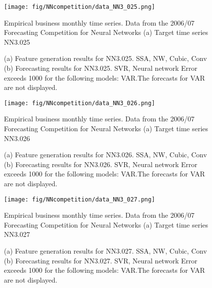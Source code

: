 \documentclass[12pt]{article}
\begin{document}
\begin{figure}
\centering
\texttt{[image: fig/NNcompetition/data\_NN3\_025.png]}
\caption{Empirical business monthly time series. Data from the 2006/07 Forecasting Competition for Neural Networks	(a) Target time series	NN3.025	}
\end{figure}


\begin{figure}
\centering
{}
\caption{(a)	Feature generation results for	NN3.025.	SSA, NW, Cubic, Conv	(b)	Forecasting results for	NN3.025.	SVR, Neural network	Error exceeds 1000 for the following models: VAR.The forecasts for VAR are not displayed.	}
\end{figure}


\begin{figure}
\centering
\texttt{[image: fig/NNcompetition/data\_NN3\_026.png]}
\caption{Empirical business monthly time series. Data from the 2006/07 Forecasting Competition for Neural Networks	(a) Target time series	NN3.026	}
\end{figure}


\begin{figure}
\centering
{}
\caption{(a)	Feature generation results for	NN3.026.	SSA, NW, Cubic, Conv	(b)	Forecasting results for	NN3.026.	SVR, Neural network	Error exceeds 1000 for the following models: VAR.The forecasts for VAR are not displayed.	}
\end{figure}


\begin{figure}
\centering
\texttt{[image: fig/NNcompetition/data\_NN3\_027.png]}
\caption{Empirical business monthly time series. Data from the 2006/07 Forecasting Competition for Neural Networks	(a) Target time series	NN3.027	}
\end{figure}


\begin{figure}
\centering
{}
\caption{(a)	Feature generation results for	NN3.027.	SSA, NW, Cubic, Conv	(b)	Forecasting results for	NN3.027.	SVR, Neural network	Error exceeds 1000 for the following models: VAR.The forecasts for VAR are not displayed.	}
\end{figure}
\end{document}
